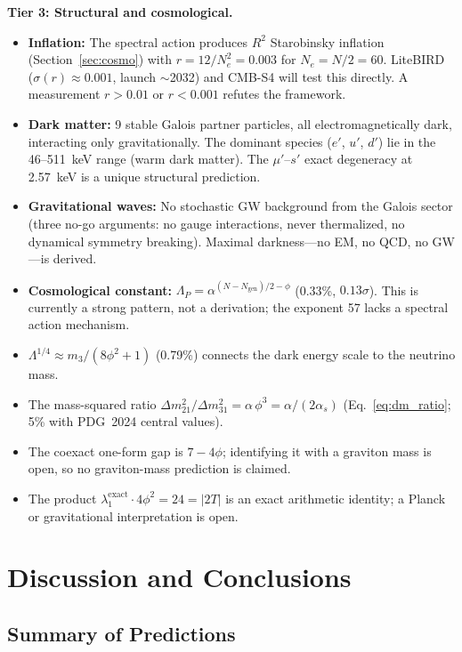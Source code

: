 \documentclass[12pt,a4paper]{article}
\theoremstyle{definition}
\begin{document}
\textbf{Tier 3: Structural and cosmological.}
\begin{itemize}
\item \textbf{Inflation:} The spectral action produces $R^2$ Starobinsky inflation (Section~\ref{sec:cosmo}) with $r = 12/N_e^2 = 0.003$ for $N_e = N/2 = 60$.  LiteBIRD~\cite{LiteBIRD2023} ($\sigma(r) \approx 0.001$, launch $\sim$2032) and CMB-S4 will test this directly.  A measurement $r > 0.01$ or $r < 0.001$ refutes the framework.
\item \textbf{Dark matter:} 9 stable Galois partner particles, all electromagnetically dark, interacting only gravitationally.  The dominant species ($e'$, $u'$, $d'$) lie in the 46--511~keV range (warm dark matter).  The $\mu'$--$s'$ exact degeneracy at 2.57~keV is a unique structural prediction.
\item \textbf{Gravitational waves:} No stochastic GW background from the Galois sector (three no-go arguments: no gauge interactions, never thermalized, no dynamical symmetry breaking).  Maximal darkness---no EM, no QCD, no GW---is derived.
\item \textbf{Cosmological constant:} $\Lambda_P = \alpha^{(N - N_{\text{gen}})/2 - \phi}$ (0.33\%, $0.13\sigma$).  This is currently a strong pattern, not a derivation; the exponent 57 lacks a spectral action mechanism.
\item $\Lambda^{1/4} \approx m_3 / (8\phi^2 + 1)$ (0.79\%) connects the dark energy scale to the neutrino mass.
\item The mass-squared ratio $\Delta m^2_{21}/\Delta m^2_{31} = \alpha\,\phi^3 = \alpha/(2\alpha_s)$ (Eq.~\ref{eq:dm_ratio}; 5\% with PDG~2024 central values).
\item The coexact one-form gap is $7-4\phi$; identifying it with a graviton mass is open, so no graviton-mass prediction is claimed.
\item The product $\lambda_1^{\text{exact}}\cdot4\phi^2=24=|2T|$ is an exact arithmetic identity; a Planck or gravitational interpretation is open.
\end{itemize}



\section{Discussion and Conclusions}
\label{sec:discussion}

\subsection{Summary of Predictions}
\end{document}
